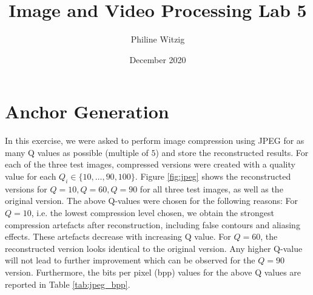 \documentclass{article}
\title{Image and Video Processing Lab 5}
\author{Philine Witzig}
\date{December 2020}
\begin{document}
\maketitle

\section{Anchor Generation}

In this exercise, we were asked to perform image compression using JPEG for as many Q values as possible (multiple of $5$) and store the reconstructed results. For each of the three test images, compressed versions were created with a quality value for each $Q_i \in \{10, \dots, 90, 100 \}$. Figure \ref{fig:jpeg} shows the reconstructed versions for $Q=10, Q=60, Q=90$ for all three test images, as well as the original version. The above Q-values were chosen for the following reasons: For $Q=10$, i.e. the lowest compression level chosen, we obtain the strongest compression artefacts after reconstruction, including false contours and aliasing effects. These artefacts decrease with increasing Q value. For $Q=60$, the reconstructed version looks identical to the original version. Any higher Q-value will not lead to further improvement which can be observed for the $Q=90$ version. Furthermore, the bits per pixel (bpp) values for the above Q values are reported in Table \ref{tab:jpeg_bpp}.
\end{document}
